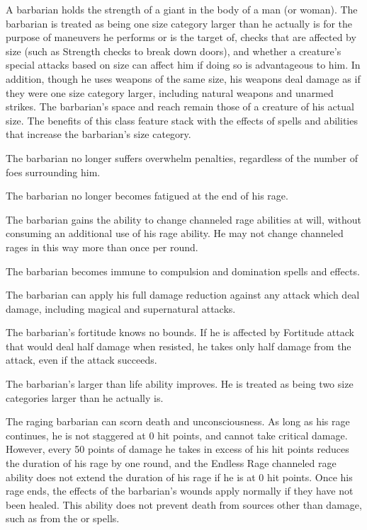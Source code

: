  A barbarian holds the strength of a giant in the body of a man (or woman). The barbarian is treated as being one size category larger than he actually is for the purpose of maneuvers he performs or is the target of, checks that are affected by size (such as Strength checks to break down doors), and whether a creature's special attacks based on size can affect him if doing so is advantageous to him. In addition, though he uses weapons of the same size, his weapons deal damage as if they were one size category larger, including natural weapons and unarmed strikes. The barbarian's space and reach remain those of a creature of his actual size. The benefits of this class feature stack with the effects of spells and abilities that increase the barbarian's size category.

 The barbarian no longer suffers overwhelm penalties, regardless of the number of foes surrounding him.

 The barbarian no longer becomes fatigued at the end of his rage.

 The barbarian gains the ability to change channeled rage abilities at will, without consuming an additional use of his rage ability. He may not change channeled rages in this way more than once per round.

 The barbarian becomes immune to compulsion and domination spells and effects.

 The barbarian can apply his full damage reduction against any attack which deal damage, including magical and supernatural attacks.

 The barbarian's fortitude knows no bounds. If he is affected by Fortitude attack that would deal half damage when resisted, he takes only half damage from the attack, even if the attack succeeds.

 The barbarian's larger than life ability improves. He is treated as being two size categories larger than he actually is.

 The raging barbarian can scorn death and unconsciousness. As long as his rage continues, he is not staggered at 0 hit points, and cannot take critical damage. However, every 50 points of damage he takes in excess of his hit points reduces the duration of his rage by one round, and the Endless Rage channeled rage ability does not extend the duration of his rage if he is at 0 hit points. Once his rage ends, the effects of the barbarian's wounds apply normally if they have not been healed. This ability does not prevent death from sources other than damage, such as from the  or  spells.

